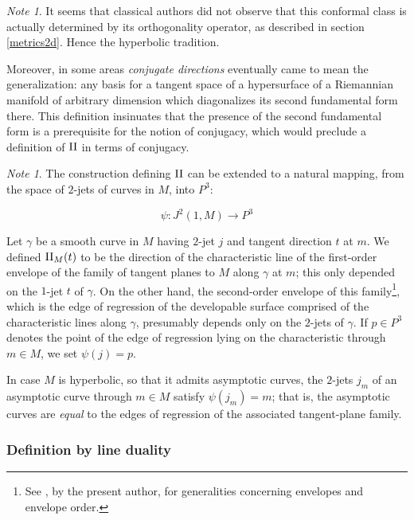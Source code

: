 \documentclass[11pt]{article}
\numberwithin{equation}{section}
\newcounter{count}
\theoremstyle{plain}
\theoremstyle{remark}
\newtheorem{note}[count]{Note}
\newcommand{\II}{\textnormal{II}}
\begin{document}
\begin{note}
It seems that classical authors did not observe that this conformal class is actually determined by its orthogonality operator, as described in section \ref{metrics2d}. Hence the hyperbolic tradition.

Moreover, in some areas \emph{conjugate directions} eventually came to mean the generalization: any basis for a tangent space of a hypersurface of a Riemannian manifold of arbitrary dimension which diagonalizes its second fundamental form there. This definition insinuates that the presence of the second fundamental form is a prerequisite for the notion of conjugacy, which would preclude a definition of $\II$ in terms of conjugacy.
\end{note}

\begin{note} The construction defining $\II$ can be extended to a natural mapping, from the space of $2$-jets of curves in $M$, into $P^{3}$:

\[\psi: J^{2}(1,M)\rightarrow P^{3} \]

Let $\gamma$ be a smooth curve in $M$ having $2$-jet $j$ and tangent direction $t$ at $m$. We defined $\II_M(t)$ to be the direction of the characteristic line of the first-order envelope of the family of tangent planes to $M$ along $\gamma$ at $m$; this only depended on the $1$-jet $t$ of $\gamma$. On the other hand, the second-order envelope of this family\footnote{See \cite{myenvpaper}, by the present author, for generalities concerning envelopes and envelope order.}, which is the edge of regression of the developable surface comprised of the characteristic lines along $\gamma$, presumably depends only on the $2$-jets of $\gamma$. If $p\in P^{3}$ denotes the point of the edge of regression lying on the characteristic through $m\in M$, we set $\psi(j)=p$.

In case $M$ is hyperbolic, so that it admits asymptotic curves, the $2$-jets $j_m$ of an asymptotic curve through $m\in M$ satisfy $\psi(j_m)=m$; that is, the asymptotic curves are \emph{equal} to the edges of regression of the associated tangent-plane family.

\end{note}


\subsubsection{Definition by line duality}
\end{document}
